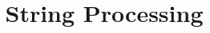 \documentclass{beamer}
\title{String Processing}
\begin{document}
\frame{
  \titlepage
}
\end{document}
